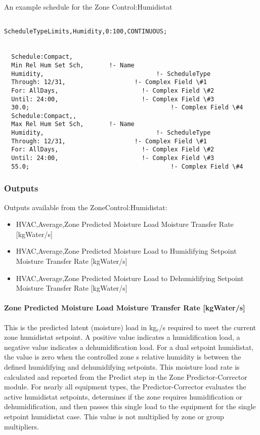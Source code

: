 An example schedule for the Zone Control:Humidistat

\begin{lstlisting}

ScheduleTypeLimits,Humidity,0:100,CONTINUOUS;


  Schedule:Compact,
  Min Rel Hum Set Sch,       !- Name
  Humidity,                               !- ScheduleType
  Through: 12/31,                   !- Complex Field \#1
  For: AllDays,                       !- Complex Field \#2
  Until: 24:00,                       !- Complex Field \#3
  30.0;                                       !- Complex Field \#4
  Schedule:Compact,,
  Max Rel Hum Set Sch,       !- Name
  Humidity,                               !- ScheduleType
  Through: 12/31,                   !- Complex Field \#1
  For: AllDays,                       !- Complex Field \#2
  Until: 24:00,                       !- Complex Field \#3
  55.0;                                       !- Complex Field \#4
\end{lstlisting}

\subsubsection{Outputs}\label{outputs-2-027}

Outputs available from the ZoneControl:Humidistat:

\begin{itemize}
\item
  HVAC,Average,Zone Predicted Moisture Load Moisture Transfer Rate {[}kgWater/s{]}
\item
  HVAC,Average,Zone Predicted Moisture Load to Humidifying Setpoint Moisture Transfer Rate {[}kgWater/s{]}
\item
  HVAC,Average,Zone Predicted Moisture Load to Dehumidifying Setpoint Moisture Transfer Rate {[}kgWater/s{]}
\end{itemize}

\paragraph{Zone Predicted Moisture Load Moisture Transfer Rate {[}kgWater/s{]}}\label{zone-predicted-moisture-load-moisture-transfer-rate-kgwaters}

This is the predicted latent (moisture) load in kg\(_{r}\)/s required to meet the current zone humidistat setpoint. A positive value indicates a humidification load, a negative value indicates a dehumidification load. For a dual setpoint humidistat, the value is zero when the controlled zone s relative humidity is between the defined humidifying and dehumidifying setpoints. This moisture load rate is calculated and reported from the Predict step in the Zone Predictor-Corrector module. For nearly all equipment types, the Predictor-Corrector evaluates the active humidistat setpoints, determines if the zone requires humidification or dehumidification, and then passes this single load to the equipment for the single setpoint humidistat case. This value is not multiplied by zone or group multipliers.

